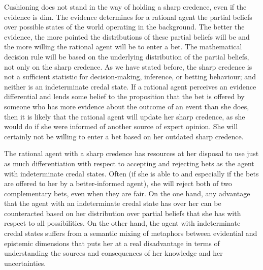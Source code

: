 Cushioning does not stand in the way of holding a sharp
credence, even if the evidence is dim. The evidence
determines for a rational agent the partial beliefs
over possible states of the world operating in the
background. The better the evidence, the more pointed
the distributions of these partial beliefs will be and
the more willing the rational agent will be to enter a
bet. The mathematical decision rule will be based on
the underlying distribution of the partial beliefs, not
only on the sharp credence. As we have stated before,
the sharp credence is not a sufficient statistic for
decision-making, inference, or betting behaviour; and
neither is an indeterminate credal state. If a rational
agent perceives an evidence differential and lends some
belief to the proposition that the bet is offered by
someone who has more evidence about the outcome of an
event than she does, then it is likely that the
rational agent will update her sharp credence, as she
would do if she were informed of another source of
expert opinion. She will certainly not be willing to
enter a bet based on her outdated sharp credence.

The rational agent with a sharp credence has resources
at her disposal to use just as much differentiation
with respect to accepting and rejecting bets as the
agent with indeterminate credal states. Often (if she
is able to and especially if the bets are offered to
her by a better-informed agent), she will reject both
of two complementary bets, even when they are fair. On
the one hand, any advantage that the agent with an
indeterminate credal state has over her can be
counteracted based on her distribution over partial
beliefs that she has with respect to all possibilities.
On the other hand, the agent with indeterminate credal
states suffers from a semantic mixing of metaphors
between evidential and epistemic dimensions that puts
her at a real disadvantage in terms of understanding
the sources and consequences of her knowledge and her
uncertainties.
